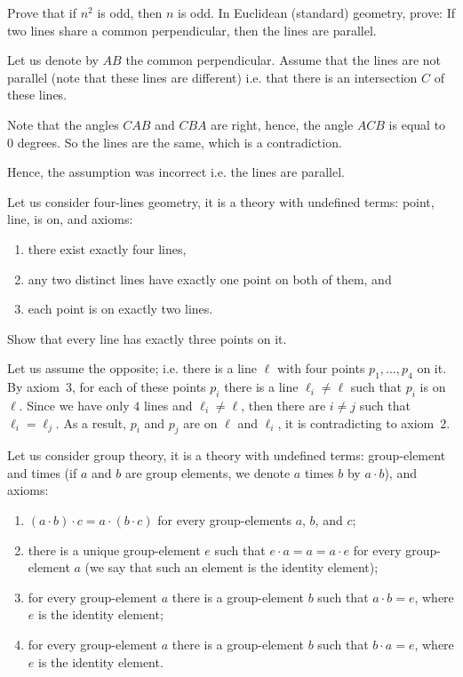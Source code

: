 \begin{chapterendexercises}
    \exercise[recommended] Prove that if $n^2$ is odd, then $n$ is odd.
    \exercise  In Euclidean (standard) geometry, prove: If two lines share a
        common perpendicular, then the lines are parallel.
        \begin{solution}
          Let us denote by $AB$ the common perpendicular. Assume that the lines
          are not parallel (note that these lines are different) i.e. that there
          is an intersection $C$ of these lines.

          Note that the angles $CAB$ and $CBA$ are right, hence, the angle $ACB$
          is equal to $0$ degrees. So the lines are the same, which is a
          contradiction. 

          Hence, the assumption was incorrect i.e. the lines are parallel.
        \end{solution}
    \exercise[recommended] Let us consider four-lines geometry, it is a theory with
        undefined terms: point, line, is on, and axioms:
        \begin{enumerate}
            \item there exist exactly four lines,
            \item any two distinct lines have exactly one point on both of them, and
            \item each point is on exactly two lines.
        \end{enumerate}

        Show that every line has exactly three points on it.
        \begin{solution}
          Let us assume the opposite; i.e. there is a line $\ell$ with four
          points $p_1, \dots, p_4$ on it. By axiom~3, for each of these points
          $p_i$ there is a line $\ell_i \neq \ell$ such that $p_i$ is on $\ell$.
          Since we have only $4$ lines and $\ell_i \neq \ell$, then there are $i
          \neq j$ such that $\ell_i = \ell_j$. As a result, $p_i$ and $p_j$ are
          on $\ell$ and $\ell_i$, it is contradicting to axiom~2.
        \end{solution}
    \exercise Let us consider group theory, it is a theory with undefined
        terms: group-element and times (if $a$ and $b$ are group elements,
        we denote $a$ times $b$ by $a \cdot b$), and axioms:
        \begin{enumerate}
          \item $(a \cdot b) \cdot c = a \cdot (b \cdot c)$
            for every group-elements $a$, $b$, and $c$;
          \item there is a unique group-element $e$ such that
            $e \cdot a = a = a \cdot e$ for every group-element $a$
            (we say that such an element is the identity element);
          \item for every group-element $a$ there is a group-element $b$
            such that $a \cdot b = e$, where $e$ is the identity element;
          \item for every group-element $a$ there is a group-element $b$
            such that $b \cdot a = e$, where $e$ is the identity element.
        \end{enumerate}


\end{chapterendexercises}

